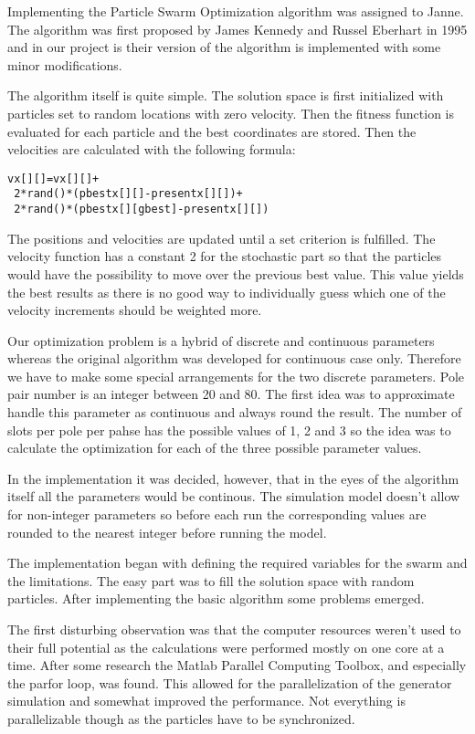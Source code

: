 \documentclass[twoside]{article}
\begin{document}
\begin{multicols}{2}
Implementing the Particle Swarm Optimization algorithm was assigned to Janne. The algorithm was first proposed by James Kennedy and Russel Eberhart in 1995 and in our project is their version of the algorithm is implemented with some minor modifications.

The algorithm itself is quite simple. The solution space is first initialized with particles set to random locations with zero velocity. Then the fitness function is evaluated for each particle and the best coordinates are stored. Then the velocities are calculated with the following formula: \cite{pso}
\begin{verbatim}
vx[][]=vx[][]+
 2*rand()*(pbestx[][]-presentx[][])+
 2*rand()*(pbestx[][gbest]-presentx[][])
\end{verbatim}

The positions and velocities are updated until a set criterion is fulfilled. The velocity function has a constant 2 for the stochastic part so that the particles would have the possibility to move over the previous best value. This value yields the best results as there is no good way to individually guess which one of the velocity increments should be weighted more. \cite{pso} 

Our optimization problem is a hybrid of discrete and continuous parameters whereas the original algorithm was developed for continuous case only. Therefore we have to make some special arrangements for the two discrete parameters. Pole pair number is an integer between 20 and 80. The first idea was to approximate handle this parameter as continuous and always round the result. The number of slots per pole per pahse has the possible values of 1, 2 and 3 so the idea was to calculate the optimization for each of the three possible parameter values.

In the implementation it was decided, however, that in the eyes of the algorithm itself all the parameters would be continous. The simulation model doesn't allow for non-integer parameters so before each run the corresponding values are rounded to the nearest integer before running the model.

The implementation began with defining the required variables for the swarm and the limitations. The easy part was to fill the solution space with random particles. After implementing the basic algorithm some problems emerged.

The first disturbing observation was that the computer resources weren't used to their full potential as the calculations were performed mostly on one core at a time. After some research the Matlab Parallel Computing Toolbox, and especially the parfor loop, was found. This allowed for the parallelization of the generator simulation and somewhat improved the performance. Not everything is parallelizable though as the particles have to be synchronized. 


\end{multicols}
\end{document}
